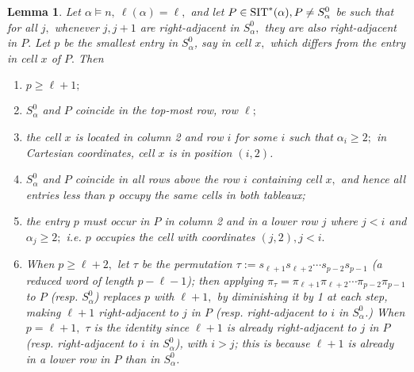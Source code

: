 \documentclass[12pt,letterpaper]{amsart}
\newtheorem{lemma}[theorem]{Lemma}
\theoremstyle{definition}
\begin{document}
\begin{lemma}\label{lem:indecomplemma4-c} Let $\alpha\vDash n, \ \ell(\alpha)=\ell,$ and let $P \in \operatorname{SIT}^*(\alpha), P\ne S^0_\alpha$ be such that for all $j,$ whenever $j, j+1$ are right-adjacent in $S^0_\alpha,$ they are also right-adjacent in $P.$  
Let $p$ be the smallest entry in $S^0_\alpha$, say in cell $x,$ which differs from the entry in cell $x$ of $P.$ Then 
\begin{enumerate}
    \item $p\ge \ell+1;$
    \item $S^0_\alpha$ and $P$ coincide in the top-most row, row $\ell;$
    \item  the cell $x$ is located in column 2 and row $i$ for some $i$ such that $\alpha_i\ge 2;$ in Cartesian coordinates, cell $x$ is in position $(i,2)$.  
    \item $S^0_\alpha$ and $P$ coincide in all rows above the row $i$ containing cell $x,$ and hence all entries less than $p$ occupy the same cells in both tableaux;
    \item the entry $p$ must occur in $P$ in column 2 and in a lower row $j$ where $j<i$ and $\alpha_j\ge 2;$ i.e. $p$ occupies the cell with coordinates $(j,2), j<i.$
    \item When $p\ge \ell+2,$ let $\tau$ be the permutation $\tau:= s_{\ell+1 }s_{\ell+2}\cdots s_{p-2}s_{p-1}$ (a reduced word of length $p-\ell-1$); then applying $\pi_\tau=\pi_{\ell+1 }\pi_{\ell+2}\cdots \pi_{p-2}\pi_{p-1}$ to $P$ (resp. $S^0_\alpha$) replaces $p$ with $\ell+1,$ by diminishing it by 1 at each step, making $\ell+1$ right-adjacent to $j$ in $P$ (resp. right-adjacent to $i$ in $S^0_\alpha$.)  When $p= \ell+1,$ $\tau$ is the identity since $\ell+1$ is already right-adjacent to $j$ in $P$ (resp. right-adjacent to $i$ in $S^0_\alpha$), with $i>j$; this is because $\ell+1$ is already in a lower row in $P$ than in $S^0_\alpha$. 
\end{enumerate}
\end{lemma}
\end{document}
